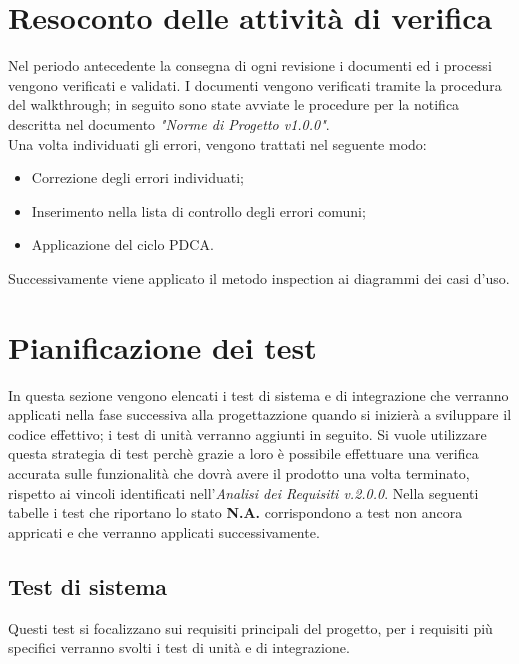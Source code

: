 \documentclass[12pt,a4paper,titlepage]{article}
\begin{document}
	\newpage
	\section{Resoconto delle attività di verifica}
	Nel periodo antecedente la consegna di ogni revisione i documenti ed i processi vengono verificati e validati. I documenti vengono verificati tramite la procedura del walkthrough; in seguito sono state avviate le procedure per la notifica descritta nel documento \textit{"Norme di Progetto v1.0.0"}.\\
	Una volta individuati gli errori, vengono trattati nel seguente modo:
	\begin{itemize}
		\item Correzione degli errori individuati;
		\item Inserimento nella lista di controllo degli errori comuni;
		\item Applicazione del ciclo PDCA.
	\end{itemize}
	Successivamente viene applicato il metodo inspection ai diagrammi dei casi d'uso.
	
	\newpage
	\section{Pianificazione dei test}
	In questa sezione vengono elencati i test di sistema e di integrazione che verranno applicati nella fase successiva alla progettazzione quando si inizierà a sviluppare il codice effettivo; i test di unità verranno aggiunti in seguito.
	Si vuole utilizzare questa strategia di test perchè grazie a loro è possibile effettuare una verifica accurata sulle funzionalità che dovrà avere il prodotto una volta terminato, rispetto ai vincoli identificati nell'\textit{Analisi dei Requisiti v.2.0.0}.
	Nella seguenti tabelle i test che riportano lo stato \textbf{N.A.} corrispondono a test non ancora appricati e che verranno applicati successivamente.
	
	\subsection{Test di sistema}
	Questi test si focalizzano sui requisiti principali del progetto, per i requisiti più specifici verranno svolti i test di unità e di integrazione.
	
\end{document}
